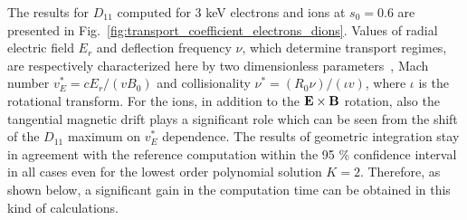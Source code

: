 \documentclass[./main.tex]{subfiles}
\begin{document}
The results for $D_{11}$ computed for 3 keV electrons and ions at $s_0=0.6$ are presented in
Fig.~\ref{fig:transport_coefficient_electrons_dions}.
Values of radial electric field $E_r$ and deflection frequency $\nu$, which determine
transport regimes, are respectively characterized here by two dimensionless
parameters~\cite{beidler_benchmarking_2011}, Mach number $v_E^\ast = c E_r /(vB_0 )$ and
collisionality $\nu^\ast = (R_0 \nu)/(\iota v)$, where $\iota$ is the rotational transform.
For the ions, in addition to the ${\textbf{E}}\times{\textbf{B}}$ rotation, also the tangential magnetic drift
plays a significant role which can be seen from the shift of the $D_{11}$ maximum on $v_E^\ast$
dependence. The results of geometric integration stay in agreement
with the reference computation within the 95 \% confidence interval in all cases even for the lowest
order polynomial solution $K=2$. Therefore, as shown below, a significant gain in the computation
time can be obtained in this kind of calculations.
%
\end{document}
